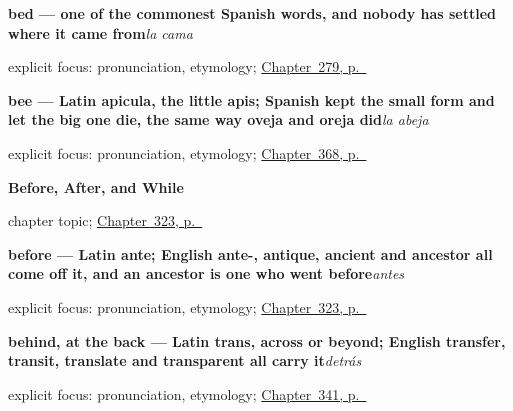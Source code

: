 \noindent\begin{minipage}[t]{\linewidth}
\raggedright
\textbf{bed — one of the commonest Spanish words, and nobody has settled where it came from}\enspace\emph{la cama}\par
\footnotesize explicit focus: pronunciation, etymology; \hyperref[ch:la-habitacion]{Chapter~279, p.~\pageref*{ch:la-habitacion}}
\end{minipage}\par\smallskip

\noindent\begin{minipage}[t]{\linewidth}
\raggedright
\textbf{bee — Latin apicula, the little apis; Spanish kept the small form and let the big one die, the same way oveja and oreja did}\enspace\emph{la abeja}\par
\footnotesize explicit focus: pronunciation, etymology; \hyperref[ch:la-abeja-y-la-mosca]{Chapter~368, p.~\pageref*{ch:la-abeja-y-la-mosca}}
\end{minipage}\par\smallskip

\noindent\begin{minipage}[t]{\linewidth}
\raggedright
\textbf{Before, After, and While}\par
\footnotesize chapter topic; \hyperref[ch:antes-y-despues]{Chapter~323, p.~\pageref*{ch:antes-y-despues}}
\end{minipage}\par\smallskip

\noindent\begin{minipage}[t]{\linewidth}
\raggedright
\textbf{before — Latin ante; English ante-, antique, ancient and ancestor all come off it, and an ancestor is one who went before}\enspace\emph{antes}\par
\footnotesize explicit focus: pronunciation, etymology; \hyperref[ch:antes-y-despues]{Chapter~323, p.~\pageref*{ch:antes-y-despues}}
\end{minipage}\par\smallskip

\noindent\begin{minipage}[t]{\linewidth}
\raggedright
\textbf{behind, at the back — Latin trans, across or beyond; English transfer, transit, translate and transparent all carry it}\enspace\emph{detrás}\par
\footnotesize explicit focus: pronunciation, etymology; \hyperref[ch:arriba-y-abajo]{Chapter~341, p.~\pageref*{ch:arriba-y-abajo}}
\end{minipage}\par\smallskip

